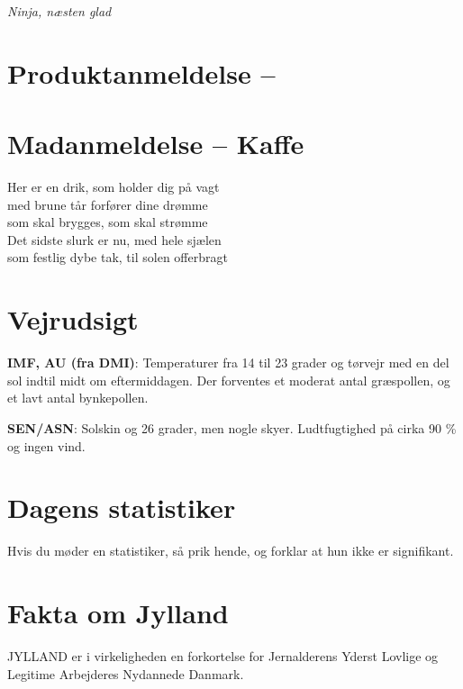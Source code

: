 \begin{minipage}[b]{0.95\linewidth}
\begin{minipage}[t]{0.47\textwidth}
{\flushright\emph{Ninja, næsten glad}}


\section*{Produktanmeldelse -- }


\vspace{1mm}
\section*{Madanmeldelse -- Kaffe}

Her er en drik, som holder dig på vagt \\
med brune tår forfører dine drømme \\
som skal brygges, som skal strømme \\
Det sidste slurk er nu, med hele sjælen \\
som festlig dybe tak, til solen offerbragt

\end{minipage}%
\hfill\begin{minipage}[t]{0.47\textwidth}
\vspace{3mm}
\section*{Vejrudsigt}
\textbf{IMF, AU (fra DMI)}: Temperaturer fra 14 til 23 grader og tørvejr med en del sol indtil midt om eftermiddagen. Der forventes et moderat antal græspollen, og et lavt antal bynkepollen.

\textbf{SEN/ASN}: Solskin og 26 grader, men nogle skyer. Ludtfugtighed på cirka 90 \% og ingen vind.

\vspace{-2mm}
\section*{Dagens statistiker}
Hvis du møder en statistiker, så prik hende, og forklar at hun ikke er signifikant.

\vspace{-2mm}
\section*{Fakta om Jylland}
JYLLAND er i virkeligheden en forkortelse for Jernalderens Yderst Lovlige og Legitime Arbejderes Nydannede Danmark.

\vspace{-2mm}

\end{minipage}
\end{minipage}
